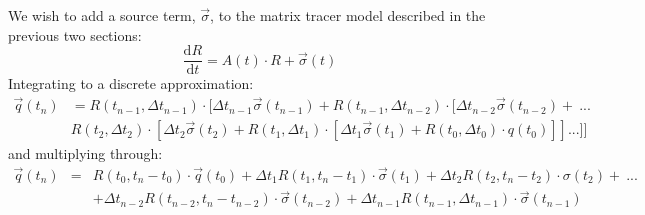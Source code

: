 \documentclass[12pt]{article}
\begin{document}
We wish to add a source term, $\vec \sigma$, to the matrix tracer model
described in the previous two sections:
\begin{equation}
\frac{\mathrm d R}{\mathrm d t} = A(t) \cdot R + \vec \sigma(t)
\end{equation}
Integrating to a discrete approximation:
\begin{eqnarray}
\vec q(t_n) & = R(t_{n-1}, \Delta t_{n-1}) \cdot [\Delta t_{n-1}\vec \sigma(t_{n-1})+R(t_{n-1}, \Delta t_{n-2}) 
\cdot [\Delta t_{n-2} \vec \sigma(t_{n-2})+~...\nonumber \\
& R(t_2, \Delta t_2) \cdot [\Delta t_2 \vec \sigma(t_2) +
R(t_1, \Delta t_1) \cdot [\Delta t_1 \vec \sigma(t_1) + R(t_0, \Delta t_0) \cdot q(t_0) ]]...]]
\end{eqnarray}
and multiplying through:
\begin{eqnarray}
\vec q(t_n) & = & R(t_0,t_n-t_0) \cdot \vec q(t_0) + \Delta t_1 R(t_1,t_n-t_1) \cdot \vec \sigma(t_1) +
\Delta t_2 R(t_2, t_n-t_2) \cdot \sigma(t_2) + ~...\nonumber \\ 
& & + \Delta t_{n-2} R(t_{n-2},t_n-t_{n-2}) \cdot \vec\sigma(t_{n-2}) + 
\Delta t_{n-1} R(t_{n-1},\Delta t_{n-1}) \cdot \vec \sigma(t_{n-1})
\end{eqnarray}



\end{document}
